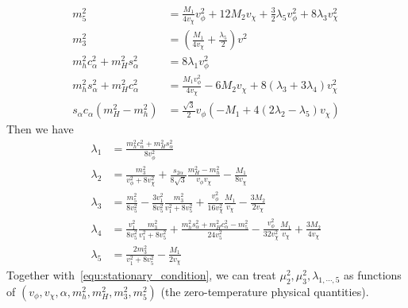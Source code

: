 \documentclass[12pt]{article}
\begin{document}
\begin{subequations}
    \label{equ:masses}
    \begin{align}
        m_5^2 &= \frac{M_1}{4v_\chi}v_\phi^2 + 12M_2v_\chi + \frac{3}{2}\lambda_5 v_\phi^2 + 8\lambda_3 v_\chi^2\\
        m_3^2 &= \left(\frac{M_1}{4v_\chi}+\frac{\lambda_5}{2}\right)v^2 \\
        m_h^2c_\alpha^2 + m_H^2 s_\alpha^2 &= 8\lambda_1v_\phi^2 \\
        m_h^2s_\alpha^2 + m_H^2 c_\alpha^2 &= \frac{M_1v_\phi^2}{4v_\chi}-6M_2v_\chi+8(\lambda_3+3\lambda_4)v_\chi^2\\
        s_\alpha c_\alpha (m_H^2 - m_h^2) &= \frac{\sqrt{3}}{2}v_\phi\left(-M_1+4(2\lambda_2 - \lambda_5)v_\chi\right)
    \end{align}
\end{subequations}
Then we have
\begin{subequations}
    \begin{align}
        \lambda_1 &= \frac{m_h^2 c_\alpha^2 + m_H^2 s_\alpha^2}{8v_\phi^2}\\
        \lambda_2 &= \frac{m_3^2}{v_\phi^2 + 8 v_\chi^2} + \frac{s_{2\alpha}}{8\sqrt{3}}\frac{m_H^2-m_h^2}{v_\phi v_\chi} - \frac{M_1}{8v_\chi}\\
        \lambda_3 &= \frac{m_5^2}{8v_5^2} - \frac{3v_1^2}{8v_5^2}\frac{m_3^2}{v_1^2+8v_5^2} + \frac{v_\phi^2}{16v_\chi^2}\frac{M_1}{v_\chi} - \frac{3M_2}{2v_\chi}\\
        \lambda_4 &= \frac{v_1^2}{8v_5^2}\frac{m_3^2}{v_1^2+8v_5^2}+\frac{m_h^2s_\alpha^2+m_H^2c_\alpha^2-m_5^2}{24v_5^2}-\frac{v_\phi^2}{32v_\chi^2}\frac{M_1}{v_\chi}+\frac{3M_2}{4v_\chi}\\
        \lambda_5 &= \frac{2m_3^2}{v_1^2+8v_5^2} - \frac{M_1}{2v_\chi}
    \end{align}
\end{subequations}
Together with~\autoref{equ:stationary_condition}, we can treat $\mu_2^2,\mu_3^2,\lambda_{1,\cdots,5}$ as functions of $(v_\phi,v_\chi,\alpha,m_h^2,m_H^2,m_3^2,m_5^2)$ (the zero-temperature physical quantities).
\end{document}
